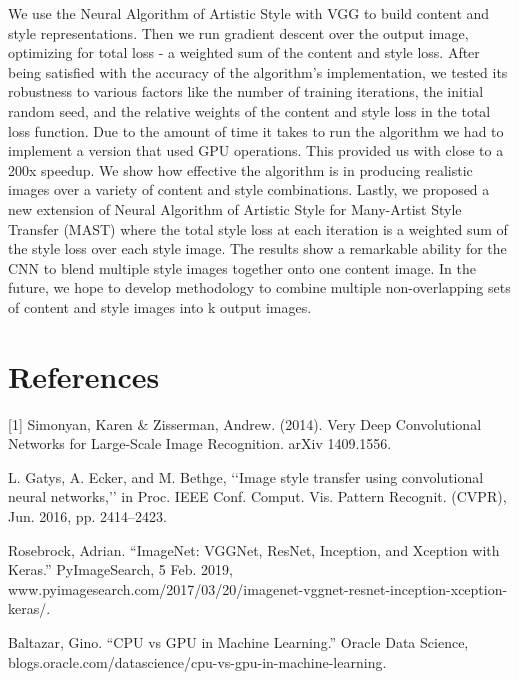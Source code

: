 \documentclass{article}
\begin{document}
We use the Neural Algorithm of Artistic Style with VGG to build content and style representations. Then we run gradient descent over the output image, optimizing for total loss - a weighted sum of the content and style loss. After being satisfied with the accuracy of the algorithm's implementation, we tested its robustness to various factors like the number of training iterations, the initial random seed, and the relative weights of the content and style loss in the total loss function. Due to the amount of time it takes to run the algorithm we had to implement a version that used GPU operations. This provided us with close to a 200x speedup. We show how effective the algorithm is in producing realistic images over a variety of content and style combinations. Lastly, we proposed a new extension of Neural Algorithm of Artistic Style for Many-Artist Style Transfer (MAST) where the total style loss at each iteration is a weighted sum of the style loss over each style image. The results show a remarkable ability for the CNN to blend multiple style images together onto one content image. In the future, we hope to develop methodology to combine multiple non-overlapping sets of content and style images into k output images.

\section*{References}

[1] Simonyan, Karen \& Zisserman, Andrew. (2014). Very Deep Convolutional Networks for Large-Scale Image Recognition. arXiv 1409.1556.

\noindent [2] L. Gatys, A. Ecker, and M. Bethge, ‘‘Image style transfer using convolutional neural networks,’’ in Proc. IEEE Conf. Comput. Vis. Pattern Recognit. (CVPR), Jun. 2016, pp. 2414–2423.

\noindent [3] Rosebrock, Adrian. “ImageNet: VGGNet, ResNet, Inception, and Xception with Keras.” PyImageSearch, 5 Feb. 2019, www.pyimagesearch.com/2017/03/20/imagenet-vggnet-resnet-inception-xception-keras/.

\noindent [4] Baltazar, Gino. “CPU vs GPU in Machine Learning.” Oracle Data Science, blogs.oracle.com/datascience/cpu-vs-gpu-in-machine-learning.
\end{document}
